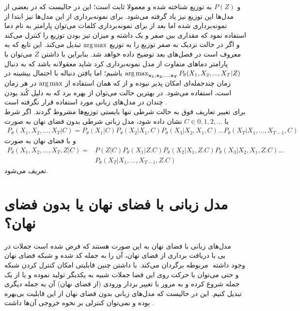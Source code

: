 و $P(Z)$ به توزیع
شناخته شده و معمولا ثابت است؛ این در حالیست که در بعضی از مدل‌ها این توزیع نیز یاد گرفته می‌شود. برای نمونه‌برداری از این مدل‌ها نیز ابتدا از \priordist{} نمونه‌برداری شده اما بعد از برای نمونه‌برداری کلمات می‌توان پارامتر به نام دما استفاده نمود که مقداری بین صفر و یک داشته و میزان تیز بودن توزیع را کنترل می‌کند و اگر در حالت نزدیک به صفر توزیع را به توزیع $\operatorname*{arg\,max}$ تبدیل می‌کند. این تابع که به  معروف است در فصل‌های بعد توضیح داده خواهد شد. بنابراین با داشتن $Z$ می‌توان با پارامتر دما‌های متفاوت از مدل نمونه‌برداری کرد \cite{toward} شاید معقولانه باشد که به دنبال 
$\operatorname*{arg\,max}_{{\bf x_1}, {\bf x_2}, ..., {\bf x_T}} P_\theta(X_1, X_2, ... , X_T|Z)$
باشیم؛ اما یافتن دنباله با احتمال بیشینه در زمان چندجمله‌ای امکان پذیر نبوده و از \greedydecoding{} که همان استفاده از $\operatorname*{arg\,max}$ در هر زمان است، استفاده می‌شود. در بهترین حالت می‌توان از 
بهره برد که به دلیل کُند بودن چندان در مدل‌های زبانی مورد استفاده قرار نگرفته است .
\\
برای تغییر تعاریف فوق به حالت شرطی تنها بایستی توزیع‌ها مشروط گردند. اگر شرط با $C \in {0,1,2,...}$ نشان داده شود، مدل زبانی شرطی بدون فضای نهان به صورت 
\begin{align}
    P_\theta(X_1, X_2, ... , X_T|C) = P_\theta(X_1|C) P_\theta(X_2|X_1,C) P_\theta(X_3|X_2, X_1,C) ... P_\theta(X_T|X_1, ..., X_{T-1},C)
\end{align}
و با فضای نهان به صورت 
\begin{align}
P_\theta(X_1, X_2, ... , X_T,Z|C) =&P(Z|C) P_\theta(X_1|Z.C) P_\theta(X_2|X_1,Z.C) P_\theta(X_3|X_2, X_1,Z.C) ... \nonumber\\& P_\theta(X_T|X_1, ..., X_{T-1},Z.C)
\end{align}
تعریف می‌شود.
\section{مدل زبانی با فضای نهان یا بدون فضای نهان؟}
مدل‌های زبانی با فضای نهان به این صورت هستند که فرض شده است جملات در فضای نهان ‎کد شده و شبکه ‎\decoder یی با دریافت برداری از فضای نهان، آن را به جمله مربوطه برگردان می‌کند. با داشتن چنین قابلیتی امکان کنترل کردن شبکه ‎\decoder{}‎ وجود داشته و حتی می‌توان با حرکت روی این فضا جملات شبیه به یکدیگر تولید نموده و یا از یک جمله شروع کرده و به مرور با تغییر بردار ورودی (از فضای نهان) آن به جمله دیگری تبدیل کنیم. این در حالیست که مدل‌های زبانی بدون فضای نهان از این قابلیت بی‌بهره بوده و نمی‌توان کنترلی بر نحوه خروجی آن‌ها داشت \cite{vae_text}.
